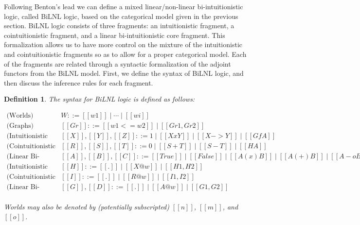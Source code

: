 \documentclass{lmcs}
\newtheorem{definition}[theorem]{Definition}
\begin{document}
Following Benton's \cite{Benton:1994} lead we can define a mixed
linear/non-linear bi-intuitionistic logic, called BiLNL logic, based
on the categorical model given in the previous section.  BiLNL logic
consists of three fragments: an intuitionistic fragment, a
cointuitionistic fragment, and a linear bi-intuitionistic core
fragment.  This formalization allows us to have more control on the
mixture of the intuitionistic and cointuitionistic fragments so as to
allow for a proper categorical model.  Each of the fragments are
related through a syntactic formalization of the adjoint functors from
the BiLNL model.  First, we define the syntax of BiLNL logic, and then
discuss the inference rules for each fragment.
\begin{definition}
  \label{def:BiLNL-syntax}
  The syntax for BiLNL logic is defined as follows:
  \begin{center}
    \begin{math}
      \begin{array}{rlllllllllll}
        \text{(Worlds)} & W ::= [[w1]] \mid \cdots \mid [[wi]]\\
        \text{(Graphs)} & [[Gr]] ::= [[w1 <= w2]] \mid [[Gr1 , Gr2]]\\
        \text{(Intuitionistic Formulas)} & [[X]], [[Y]], [[Z]] ::= 1
          \mid [[X x Y]] \mid [[X -> Y]] \mid [[Gf A]]\\
        \text{(Cointuitionistic Formulas)} &  [[R]], [[S]], [[T]] ::= 0 \mid [[S + T]] \mid [[S - T]] \mid [[H A]]\\
        \text{(Linear Bi-intuitionistic Formulas)} &
             [[A]],[[B]],[[C]] ::= [[True]] \mid [[False]] \mid
             [[A (x) B]] \mid [[A (+) B]] \mid
             [[A -o B]] \mid [[A *- B]] \mid [[F X]] \mid [[J S]]\\
             \text{(Intuitionistic Contexts)}  & [[H]] ::= [[.]] \mid
                  [[X @ w]] \mid [[H1 , H2]]\\
        \text{(Cointuitionistic Contexts)}  & [[I]] ::= [[.]] \mid
             [[R @ w]] \mid [[I1 , I2]]\\
        \text{(Linear Bi-intuitionistic Contexts)}  &
             [[G]],[[D]] ::= [[.]] \mid [[A @ w]] \mid [[G1,G2]]\\        
      \end{array}
    \end{math}
  \end{center}
  Worlds may also be denoted by (potentially subscripted) $[[n]]$,
  $[[m]]$, and $[[o]]$.


\end{definition}
\end{document}
